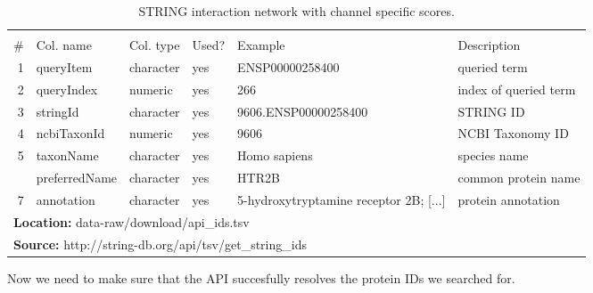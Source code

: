 \begin{table}[H]

\caption{\label{tab:api_ids}STRING interaction network with channel specific scores.}
\begin{tabular}[t]{rlllll}
\toprule
\multicolumn{6}{c}{\bgroup\fontsize{12}{14}\selectfont \cellcolor[HTML]{EEEEEE}{\ttfamily{\textbf{api\_ids}}}\egroup{}} \\
\cmidrule(l{3pt}r{3pt}){1-6}
\# & Col. name & Col. type & Used? & Example & Description\\
\midrule
\rowcolor{gray!6}  1 & queryItem & character & yes & ENSP00000258400 & queried term\\
2 & queryIndex & numeric & yes & 266 & index of queried term\\
\rowcolor{gray!6}  3 & stringId & character & yes & 9606.ENSP00000258400 & STRING ID\\
4 & ncbiTaxonId & numeric & yes & 9606 & NCBI Taxonomy ID\\
\rowcolor{gray!6}  5 & taxonName & character & yes & Homo sapiens & species name\\
\addlinespace
6 & preferredName & character & yes & HTR2B & common protein name\\
\rowcolor{gray!6}  7 & annotation & character & yes & 5-hydroxytryptamine receptor 2B; [...] & protein annotation\\
\bottomrule
\multicolumn{6}{l}{\textbf{Location: } data-raw/download/api\_ids.tsv}\\
\multicolumn{6}{l}{\textbf{Source: } http://string-db.org/api/tsv/get\_string\_ids}\\
\end{tabular}
\end{table}

Now we need to make sure that the API succesfully resolves the protein
IDs we searched for.


